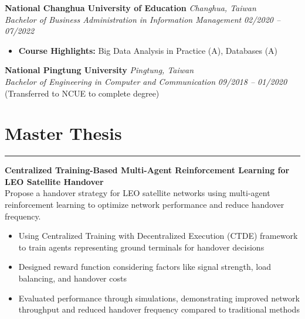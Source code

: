 \documentclass[12pt]{article}
\begin{document}
\textbf{National Changhua University of Education} \hfill \textit{Changhua, Taiwan}\\
\textit{Bachelor of Business Administration in Information Management} \hfill \textit{02/2020 -- 07/2022}

\vspace{3pt}

\begin{itemize}[leftmargin=16pt, topsep=2pt, itemsep=0pt]
    \item \textbf{Course Highlights:} Big Data Analysis in Practice (A), Databases (A)
\end{itemize}

\vspace{3pt}

\textbf{National Pingtung University} \hfill \textit{Pingtung, Taiwan}\\
\textit{Bachelor of Engineering in Computer and Communication} \hfill \textit{09/2018 -- 01/2020}\\
(Transferred to NCUE to complete degree)

\section*{\textbf{Master Thesis}}
\vspace{-3pt}
\hrule
\vspace{10pt}
\textbf{Centralized Training-Based Multi-Agent Reinforcement Learning for LEO Satellite Handover}\\
Propose a handover strategy for LEO satellite networks using multi-agent reinforcement learning to optimize network performance and reduce handover frequency.
\begin{itemize}[leftmargin=16pt, topsep=2pt, itemsep=0pt]
    \item Using Centralized Training with Decentralized Execution (CTDE) framework to train agents representing ground terminals for handover decisions
    \item Designed reward function considering factors like signal strength, load balancing, and handover costs
    \item Evaluated performance through simulations, demonstrating improved network throughput and reduced handover frequency compared to traditional methods
\end{itemize}

\end{document}
